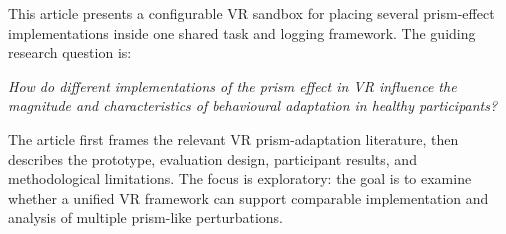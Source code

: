 This article presents a configurable VR sandbox for placing several prism-effect implementations inside one shared task and logging framework. The guiding research question is:

\begin{center}
\textit{How do different implementations of the prism effect in VR influence the magnitude and characteristics of behavioural adaptation in healthy participants?}
\end{center}

The article first frames the relevant VR prism-adaptation literature, then describes the prototype, evaluation design, participant results, and methodological limitations. The focus is exploratory: the goal is to examine whether a unified VR framework can support comparable implementation and analysis of multiple prism-like perturbations.
